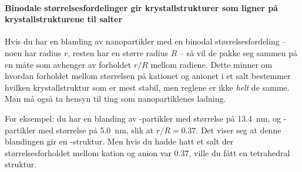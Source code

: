 \paragraph{Binodale størrelsesfordelinger gir krystallstrukturer som ligner på krystallstrukturene til salter} Hvis du har en blanding av nanopartikler med en binodal størrelsesfordeling -- noen har radius $r$, resten har en større radius $R$ -- så vil de pakke seg sammen på en måte som avhenger av forholdet $r/R$ mellom radiene. Dette minner om hvordan forholdet mellom størrelsen på kationet og anionet i et salt bestemmer hvilken krystallstruktur som er mest stabil, men reglene er ikke \emph{helt} de samme. Man må også ta hensyn til ting som nanopartiklenes ladning. 

For eksempel: du har en blanding av -partikler med størrelse på \SI{13.4}{\nano\meter}, og -partikler med størrelse på \SI{5.0}{\nano\meter}, slik at $r/R=0.37$. Det viser seg at denne blandingen gir en -struktur. Men hvis du hadde hatt et salt der størrelsesforholdet mellom kation og anion var 0.37, ville du fått en tetrahedral struktur.

